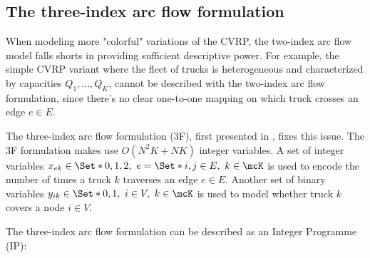 \subsection{The three-index arc flow formulation}
\label{sec:intro-cvrp-three-index-flow-formulation}

When modeling more "colorful" variations of the CVRP, the two-index arc flow model falls shorts in providing sufficient descriptive power.
For example, the simple CVRP variant where the fleet of trucks is heterogeneous and characterized by capacities $Q_1, \dots, Q_K$,
cannot be described with the two-index arc flow formulation, since there's no clear one-to-one mapping on which truck crosses an edge $e \in E$.

The three-index arc flow formulation (3F), first presented in \textcite{golden1977}, fixes this issue.
The 3F formulation makes use $O(N^2 K + N K)$ integer variables.
A set of integer variables $x_{ek} \in \Set*{0, 1, 2},\ e = \Set*{i, j} \in E,\ k \in \mcK$ is used to encode the number of times a truck $k$ traverses an edge $e \in E$.
Another set of binary variables $y_{ik} \in \Set*{0, 1},\ i \in V,\ k \in \mcK$ is used to model whether truck $k$ covers a node $i \in V$.


The three-index arc flow formulation can be described as an Integer Programme (IP):


